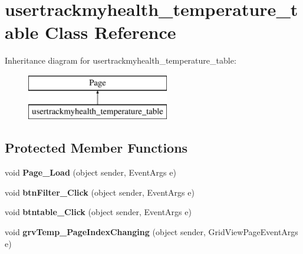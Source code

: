\hypertarget{classusertrackmyhealth__temperature__table}{\section{usertrackmyhealth\-\_\-temperature\-\_\-table Class Reference}
\label{classusertrackmyhealth__temperature__table}
}
Inheritance diagram for usertrackmyhealth\-\_\-temperature\-\_\-table\-:\begin{figure}[H]
\begin{center}
\leavevmode
\includegraphics[height=2.000000cm]{classusertrackmyhealth__temperature__table}
\end{center}
\end{figure}
\subsection*{Protected Member Functions}
\begin{DoxyCompactItemize}
\item 
\hypertarget{classusertrackmyhealth__temperature__table_ae68e88b6449234e2bb920a5c610a7bdf}{void {\bfseries Page\-\_\-\-Load} (object sender, Event\-Args e)}\label{classusertrackmyhealth__temperature__table_ae68e88b6449234e2bb920a5c610a7bdf}

\item 
\hypertarget{classusertrackmyhealth__temperature__table_a854d01c26fb4fad789f8de2b5670a6e6}{void {\bfseries btn\-Filter\-\_\-\-Click} (object sender, Event\-Args e)}\label{classusertrackmyhealth__temperature__table_a854d01c26fb4fad789f8de2b5670a6e6}

\item 
\hypertarget{classusertrackmyhealth__temperature__table_a27aba4bfbbcc1c53e43482e801119f0e}{void {\bfseries btntable\-\_\-\-Click} (object sender, Event\-Args e)}\label{classusertrackmyhealth__temperature__table_a27aba4bfbbcc1c53e43482e801119f0e}

\item 
\hypertarget{classusertrackmyhealth__temperature__table_aea9835647a4fa32cb186a66f20bcdcbd}{void {\bfseries grv\-Temp\-\_\-\-Page\-Index\-Changing} (object sender, Grid\-View\-Page\-Event\-Args e)}\label{classusertrackmyhealth__temperature__table_aea9835647a4fa32cb186a66f20bcdcbd}

\end{DoxyCompactItemize}


